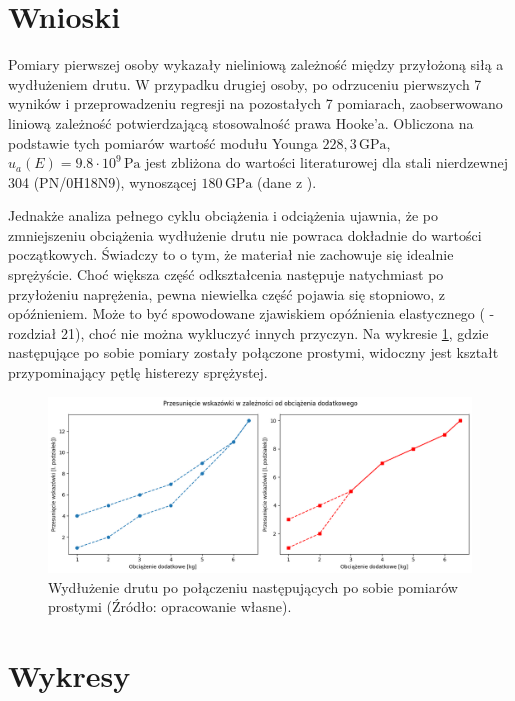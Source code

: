 \documentclass[a4paper,12pt]{article}
\begin{document}

\section{Wnioski}

Pomiary pierwszej osoby wykazały nieliniową zależność między przyłożoną siłą a wydłużeniem drutu. W przypadku drugiej osoby, po odrzuceniu pierwszych 7 wyników i przeprowadzeniu regresji na pozostałych 7 pomiarach, zaobserwowano liniową zależność potwierdzającą stosowalność prawa Hooke'a.
Obliczona na podstawie tych pomiarów wartość modułu Younga \( 228,3\,\text{GPa} \), \(u_a(E) = 9.8 \cdot 10^9\,\text{Pa}\) jest zbliżona do wartości literaturowej dla stali nierdzewnej 304 (PN/0H18N9), wynoszącej \( 180\,\text{GPa} \) (dane z \cite{calculla}).

Jednakże analiza pełnego cyklu obciążenia i odciążenia ujawnia, że po zmniejszeniu obciążenia wydłużenie drutu nie powraca dokładnie do wartości początkowych. Świadczy to o tym, że materiał nie zachowuje się idealnie sprężyście. Choć większa część odkształcenia następuje natychmiast po przyłożeniu naprężenia, pewna niewielka część pojawia się stopniowo, z opóźnieniem. Może to być spowodowane zjawiskiem opóźnienia elastycznego (\cite{Drynski1976} - rozdział 21), choć nie można wykluczyć innych przyczyn.
Na wykresie \ref{fig:histereza}, gdzie następujące po sobie pomiary zostały połączone prostymi, widoczny jest kształt przypominający pętlę histerezy sprężystej.

\begin{figure}[H]
    \centering
    \includegraphics[width=1\linewidth]{histereza.png}
    \caption{Wydłużenie drutu po połączeniu następujących po sobie pomiarów prostymi (Źródło: opracowanie własne).}
    \label{fig:histereza}
\end{figure}

\section{Wykresy}
\end{document}
